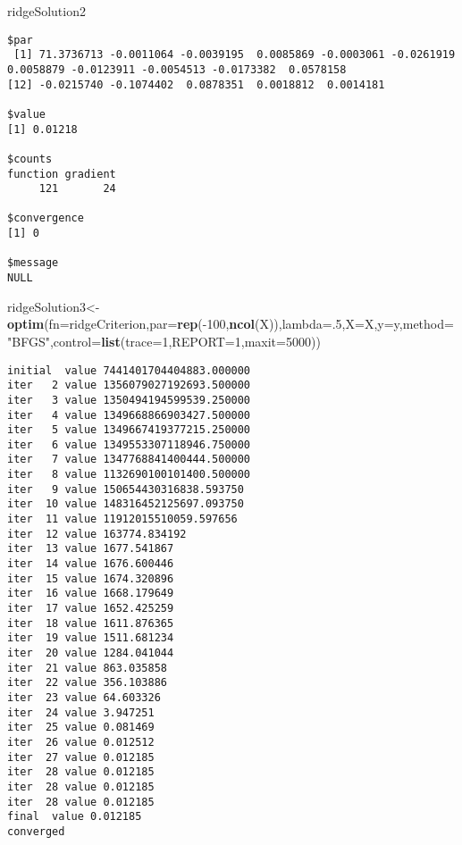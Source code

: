 \documentclass[10pt,]{article}
\newenvironment{Shaded}{\begin{snugshade}}{\end{snugshade}}
\newcommand{\KeywordTok}[1]{\textcolor[rgb]{0.13,0.29,0.53}{\textbf{{#1}}}}
\newcommand{\DataTypeTok}[1]{\textcolor[rgb]{0.13,0.29,0.53}{{#1}}}
\newcommand{\DecValTok}[1]{\textcolor[rgb]{0.00,0.00,0.81}{{#1}}}
\newcommand{\StringTok}[1]{\textcolor[rgb]{0.31,0.60,0.02}{{#1}}}
\newcommand{\NormalTok}[1]{{#1}}
\begin{document}
\begin{Shaded}
\begin{Highlighting}[]
\NormalTok{ridgeSolution2}
\end{Highlighting}
\end{Shaded}

\begin{verbatim}
$par
 [1] 71.3736713 -0.0011064 -0.0039195  0.0085869 -0.0003061 -0.0261919  0.0058879 -0.0123911 -0.0054513 -0.0173382  0.0578158
[12] -0.0215740 -0.1074402  0.0878351  0.0018812  0.0014181

$value
[1] 0.01218

$counts
function gradient 
     121       24 

$convergence
[1] 0

$message
NULL
\end{verbatim}

\begin{Shaded}
\begin{Highlighting}[]
\NormalTok{ridgeSolution3<-}\KeywordTok{optim}\NormalTok{(}\DataTypeTok{fn=}\NormalTok{ridgeCriterion,}\DataTypeTok{par=}\KeywordTok{rep}\NormalTok{(-}\DecValTok{100}\NormalTok{,}\KeywordTok{ncol}\NormalTok{(X)),}\DataTypeTok{lambda=}\NormalTok{.}\DecValTok{5}\NormalTok{,}\DataTypeTok{X=}\NormalTok{X,}\DataTypeTok{y=}\NormalTok{y,}\DataTypeTok{method=}\StringTok{"BFGS"}\NormalTok{,}\DataTypeTok{control=}\KeywordTok{list}\NormalTok{(}\DataTypeTok{trace=}\DecValTok{1}\NormalTok{,}\DataTypeTok{REPORT=}\DecValTok{1}\NormalTok{,}\DataTypeTok{maxit=}\DecValTok{5000}\NormalTok{))}
\end{Highlighting}
\end{Shaded}

\begin{verbatim}
initial  value 7441401704404883.000000 
iter   2 value 1356079027192693.500000
iter   3 value 1350494194599539.250000
iter   4 value 1349668866903427.500000
iter   5 value 1349667419377215.250000
iter   6 value 1349553307118946.750000
iter   7 value 1347768841400444.500000
iter   8 value 1132690100101400.500000
iter   9 value 150654430316838.593750
iter  10 value 148316452125697.093750
iter  11 value 11912015510059.597656
iter  12 value 163774.834192
iter  13 value 1677.541867
iter  14 value 1676.600446
iter  15 value 1674.320896
iter  16 value 1668.179649
iter  17 value 1652.425259
iter  18 value 1611.876365
iter  19 value 1511.681234
iter  20 value 1284.041044
iter  21 value 863.035858
iter  22 value 356.103886
iter  23 value 64.603326
iter  24 value 3.947251
iter  25 value 0.081469
iter  26 value 0.012512
iter  27 value 0.012185
iter  28 value 0.012185
iter  28 value 0.012185
iter  28 value 0.012185
final  value 0.012185 
converged
\end{verbatim}
\end{document}
